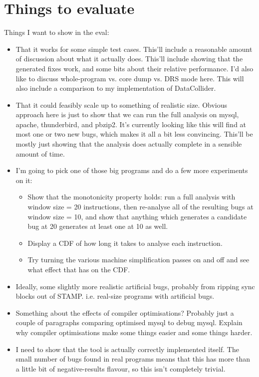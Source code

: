 \section{Things to evaluate}

Things I want to show in the eval:

\begin{itemize}
\item That it works for some simple test cases.  This'll include a
  reasonable amount of discussion about what it actually does.
  This'll include showing that the generated fixes work, and some bits
  about their relative performance.  I'd also like to discuss
  whole-program vs. core dump vs. DRS mode here.  This will also
  include a comparison to my implementation of DataCollider.
\item That it could feasibly scale up to something of realistic size.
  Obvious approach here is just to show that we can run the full
  analysis on mysql, apache, thunderbird, and pbzip2.  It's currently
  looking like this will find at most one or two new bugs, which makes
  it all a bit less convincing.  This'll be mostly just showing that
  the analysis does actually complete in a sensible amount of time.
\item I'm going to pick one of those big programs and do a few more
  experiments on it:

  \begin{itemize}
  \item Show that the monotonicity property holds: run a full analysis
    with window size = 20 instructions, then re-analyse all of the
    resulting bugs at window size = 10, and show that anything which
    generates a candidate bug at 20 generates at least one at 10 as
    well.
  \item Display a CDF of how long it takes to analyse each instruction.
  \item Try turning the various machine simplification passes on and off
    and see what effect that has on the CDF.
  \end{itemize}

\item Ideally, some slightly more realistic artificial bugs, probably
  from ripping sync blocks out of STAMP.  i.e. real-size programs with
  artificial bugs.
\item Something about the effects of compiler optimisations?  Probably
  just a couple of paragraphs comparing optimised mysql to debug
  mysql.  Explain why compiler optimisations make some things easier
  and some things harder.
\item I need to show that the tool is actually correctly implemented
  itself.  The small number of bugs found in real programs means that
  this has more than a little bit of negative-results flavour, so this
  isn't completely trivial.
\end{itemize}

